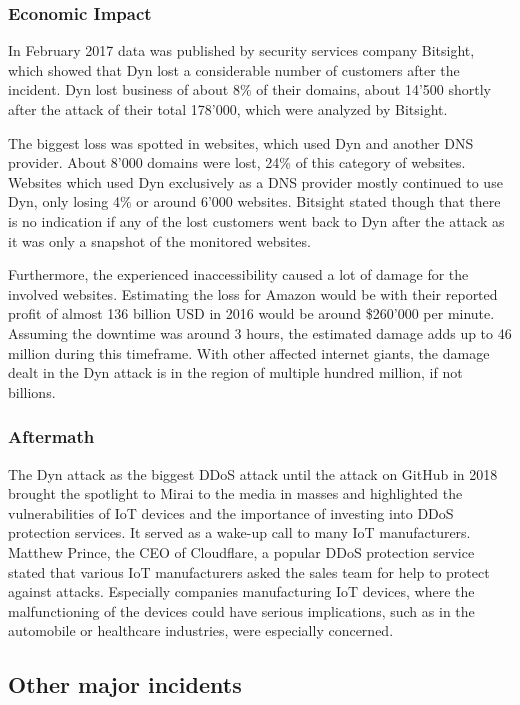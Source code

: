 	\subsubsection{Economic Impact}
	In February 2017 data was published by security services company Bitsight, which showed that Dyn lost a considerable number of customers after the incident. Dyn lost business of about 8\% of their domains, about 14'500 shortly after the attack of their total 178'000, which were analyzed by Bitsight. \cite{Varghese17}
	
The biggest loss was spotted in websites, which used Dyn and another DNS provider. About 8'000 domains were lost, 24\% of this category of websites. Websites which used Dyn exclusively as a DNS provider mostly continued to use Dyn, only losing 4\% or around 6'000 websites. Bitsight stated though that there is no indication if any of the lost customers went back to Dyn after the attack as it was only a snapshot of the monitored websites. \cite{Varghese17}

Furthermore, the experienced inaccessibility caused a lot of damage for the involved websites. Estimating the loss for Amazon would be with their reported profit of almost 136 billion USD in 2016 \cite{Macrotrends} would be around \$260'000 per minute. Assuming the downtime was around 3 hours, the estimated damage adds up to 46 million during this timeframe. With other affected internet giants, the damage dealt in the Dyn attack is in the region of multiple hundred million, if not billions.

	\subsubsection{Aftermath}
	The Dyn attack as the biggest DDoS attack until the attack on GitHub in 2018 brought the spotlight to Mirai to the media in masses and highlighted the vulnerabilities of IoT devices and the importance of investing into DDoS protection services. It served as a wake-up call to many IoT manufacturers. Matthew Prince, the CEO of Cloudflare, a popular DDoS protection service stated that various IoT manufacturers asked the sales team for help to protect against attacks. Especially companies manufacturing IoT devices, where the malfunctioning of the devices could have serious implications, such as in the automobile or healthcare industries, were especially concerned. \cite{Melendez17}
	
	\subsection{Other major incidents}
